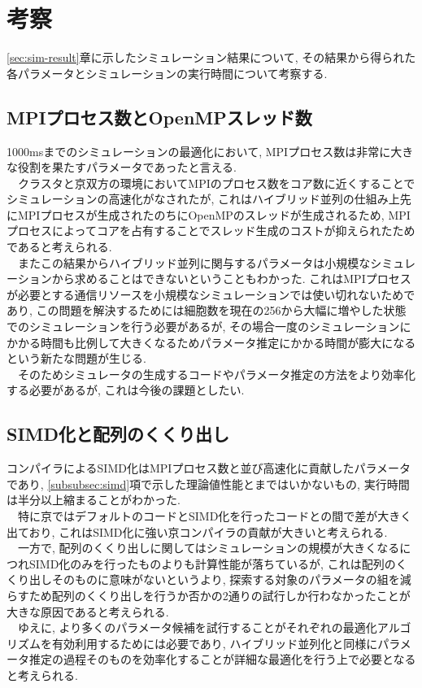 \section{考察}
\ref{sec:sim-result}章に示したシミュレーション結果について,
その結果から得られた各パラメータとシミュレーションの実行時間について考察する.\\

\subsection{MPIプロセス数とOpenMPスレッド数}
1000msまでのシミュレーションの最適化において, MPIプロセス数は非常に大きな役割を果たすパラメータであったと言える.\\
　クラスタと京双方の環境においてMPIのプロセス数をコア数に近くすることでシミュレーションの高速化がなされたが,
これはハイブリッド並列の仕組み上先にMPIプロセスが生成されたのちにOpenMPのスレッドが生成されるため,
MPIプロセスによってコアを占有することでスレッド生成のコストが抑えられたためであると考えられる.\\
　またこの結果からハイブリッド並列に関与するパラメータは小規模なシミュレーションから求めることはできないということもわかった.
これはMPIプロセスが必要とする通信リソースを小規模なシミュレーションでは使い切れないためであり,
この問題を解決するためには細胞数を現在の256から大幅に増やした状態でのシミュレーションを行う必要があるが,
その場合一度のシミュレーションにかかる時間も比例して大きくなるためパラメータ推定にかかる時間が膨大になるという新たな問題が生じる.\\
　そのためシミュレータの生成するコードやパラメータ推定の方法をより効率化する必要があるが, これは今後の課題としたい.\\

\subsection{SIMD化と配列のくくり出し}
コンパイラによるSIMD化はMPIプロセス数と並び高速化に貢献したパラメータであり,
\ref{subsubsec:simd}項で示した理論値性能とまではいかないもの, 実行時間は半分以上縮まることがわかった.\\
　特に京ではデフォルトのコードとSIMD化を行ったコードとの間で差が大きく出ており, これはSIMD化に強い京コンパイラの貢献が大きいと考えられる.\\
　一方で, 配列のくくり出しに関してはシミュレーションの規模が大きくなるにつれSIMD化のみを行ったものよりも計算性能が落ちているが,
これは配列のくくり出しそのものに意味がないというより,
探索する対象のパラメータの組を減らすため配列のくくり出しを行うか否かの2通りの試行しか行わなかったことが大きな原因であると考えられる.\\
　ゆえに, より多くのパラメータ候補を試行することがそれぞれの最適化アルゴリズムを有効利用するためには必要であり,
ハイブリッド並列化と同様にパラメータ推定の過程そのものを効率化することが詳細な最適化を行う上で必要となると考えられる.\\

